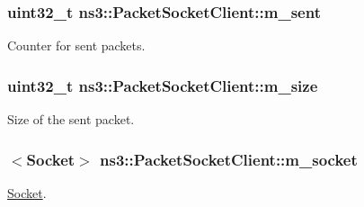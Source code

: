 \subsubsection[{\texorpdfstring{m\+\_\+sent}{m_sent}}]{\setlength{\rightskip}{0pt plus 5cm}uint32\+\_\+t ns3\+::\+Packet\+Socket\+Client\+::m\+\_\+sent\hspace{0.3cm}{\ttfamily [private]}}\hypertarget{classns3_1_1PacketSocketClient_a0b6afb6f2a5ad93754287c67f0966222}{}\label{classns3_1_1PacketSocketClient_a0b6afb6f2a5ad93754287c67f0966222}


Counter for sent packets. 

\subsubsection[{\texorpdfstring{m\+\_\+size}{m_size}}]{\setlength{\rightskip}{0pt plus 5cm}uint32\+\_\+t ns3\+::\+Packet\+Socket\+Client\+::m\+\_\+size\hspace{0.3cm}{\ttfamily [private]}}\hypertarget{classns3_1_1PacketSocketClient_ae7e5d512ebeee9d3fb2c9a72f201dc63}{}\label{classns3_1_1PacketSocketClient_ae7e5d512ebeee9d3fb2c9a72f201dc63}


Size of the sent packet. 

\subsubsection[{\texorpdfstring{m\+\_\+socket}{m_socket}}]{$<${\bf Socket}$>$ ns3\+::\+Packet\+Socket\+Client\+::m\+\_\+socket\hspace{0.3cm}{\ttfamily [private]}}\hypertarget{classns3_1_1PacketSocketClient_a4eb98581ecf226bdf7d43696b0429306}{}\label{classns3_1_1PacketSocketClient_a4eb98581ecf226bdf7d43696b0429306}


\hyperlink{classns3_1_1Socket}{Socket}. 

